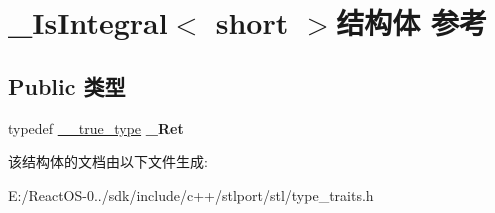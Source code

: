 \hypertarget{struct___is_integral_3_01short_01_4}{}\section{\+\_\+\+Is\+Integral$<$ short $>$结构体 参考}
\label{struct___is_integral_3_01short_01_4}
\subsection*{Public 类型}
\begin{DoxyCompactItemize}
\item 
\mbox{\label{struct___is_integral_3_01short_01_4_ab9ccb420ae14c45952de9be001b60994}} 
typedef \hyperlink{struct____true__type}{\+\_\+\+\_\+true\+\_\+type} {\bfseries \+\_\+\+Ret}
\end{DoxyCompactItemize}


该结构体的文档由以下文件生成\+:\begin{DoxyCompactItemize}
\item 
E\+:/\+React\+O\+S-\/0../sdk/include/c++/stlport/stl/type\+\_\+traits.\+h\end{DoxyCompactItemize}
